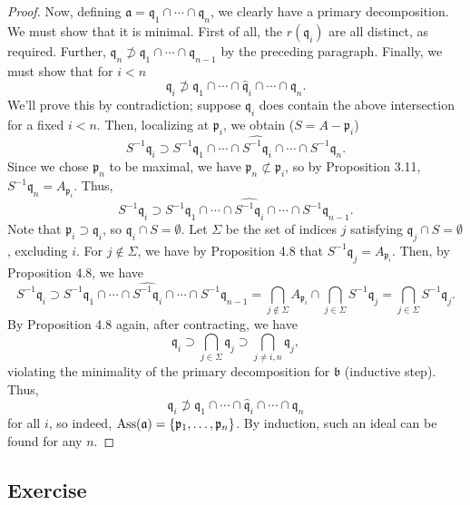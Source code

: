 \begin{proof}
Now, defining $\mathfrak{a} = \mathfrak{q}_1 \cap \cdots \cap \mathfrak{q}_n$, we clearly have a primary decomposition. We must show that it is minimal. First of all, the $r(\mathfrak{q}_i)$ are all
distinct, as required. Further, $\mathfrak{q}_n \not\supset \mathfrak{q}_1 \cap \cdots \cap \mathfrak{q}_{n-1}$ by the preceding paragraph. Finally, we must show that for $i < n$
$$\mathfrak{q}_i \not\supset \mathfrak{q}_1 \cap \cdots \cap \hat{\mathfrak{q}}_i \cap \cdots \cap \mathfrak{q}_n.$$
We'll prove this by contradiction; suppose $\mathfrak{q}_i$ does contain the above intersection for a fixed $i < n$. Then, localizing at $\mathfrak{p}_i$, we obtain ($S = A - \mathfrak{p}_i$)
$$S^{-1}\mathfrak{q}_i \supset S^{-1}\mathfrak{q}_1 \cap \cdots \cap \widehat{S^{-1}\mathfrak{q}_i} \cap \cdots \cap S^{-1}\mathfrak{q}_n.$$
Since we chose $\mathfrak{p}_n$ to be maximal, we have $\mathfrak{p}_n \not\subset \mathfrak{p}_i$, so by Proposition 3.11, $S^{-1}\mathfrak{q}_n = A_{\mathfrak{p}_i}$. Thus,
$$S^{-1}\mathfrak{q}_i \supset S^{-1}\mathfrak{q}_1 \cap \cdots \cap \widehat{S^{-1}\mathfrak{q}_i} \cap \cdots \cap S^{-1}\mathfrak{q}_{n-1}.$$
Note that $\mathfrak{p}_i \supset \mathfrak{q}_i$, so $\mathfrak{q}_i \cap S = \emptyset$. Let $\Sigma$ be the set of indices $j$ satisfying $\mathfrak{q}_j \cap S = \emptyset$, excluding $i$. For
$j \not\in \Sigma$, we have by Proposition 4.8 that $S^{-1}\mathfrak{q}_j = A_{\mathfrak{p}_i}$. Then, by Proposition 4.8, we have
$$S^{-1}\mathfrak{q}_i \supset S^{-1}\mathfrak{q}_1 \cap \cdots \cap \widehat{S^{-1}\mathfrak{q}_i} \cap \cdots \cap S^{-1}\mathfrak{q}_{n-1} = \bigcap_{j \not\in \Sigma} A_{\mathfrak{p}_i} \cap \bigcap_{j \in \Sigma}S^{-1}\mathfrak{q}_j
= \bigcap_{j \in \Sigma}S^{-1}\mathfrak{q}_j.$$
By Proposition 4.8 again, after contracting, we have
$$\mathfrak{q}_i \supset \bigcap_{j \in \Sigma}\mathfrak{q}_j \supset \bigcap_{j \neq i,n}\mathfrak{q}_j,$$
violating the minimality of the primary decomposition for $\mathfrak{b}$ (inductive step). Thus, 
$$\mathfrak{q}_i \not\supset \mathfrak{q}_1 \cap \cdots \cap \hat{\mathfrak{q}}_i \cap \cdots \cap \mathfrak{q}_n$$
for all $i$, so indeed, $\operatorname{Ass}(\mathfrak{a}) = \{\mathfrak{p}_1,\ldots,\mathfrak{p}_n\}$. By induction, such an ideal can be found for any $n$.
\end{proof}

\subsection{Exercise}\label{4.20}

